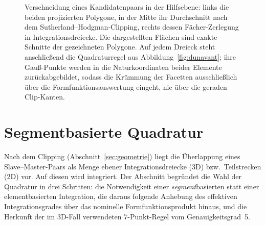 \documentclass[a4paper,11pt]{article}
\let\stdsection\section
\renewcommand{\section}{\clearpage\stdsection}
\begin{document}
\begin{figure}[htbp]
\caption[Projektion, Clipping und Triangulierung]{Verschneidung eines Kandidatenpaars in der
Hilfsebene: links die beiden projizierten Polygone, in der Mitte ihr Durchschnitt nach dem
Sutherland--Hodgman-Clipping, rechts dessen Fächer-Zerlegung in Integrationsdreiecke. Die
dargestellten Flächen sind exakte Schnitte der gezeichneten Polygone. Auf jedem Dreieck steht
anschließend die Quadraturregel aus Abbildung~\ref{fig:dunavant}; ihre Gauß-Punkte werden in die
Naturkoordinaten beider Elemente zurückabgebildet, sodass die Krümmung der Facetten ausschließlich
über die Formfunktionsauswertung eingeht, nie über die geraden Clip-Kanten.}
\label{fig:clipping}
\end{figure}

\section{Segmentbasierte Quadratur}
\label{sec:quadratur}

Nach dem Clipping (Abschnitt~\ref{sec:geometrie}) liegt die Überlappung eines Slave--Master-Paars
als Menge ebener Integrationsdreiecke (3D) bzw.\ Teilstrecken (2D) vor. Auf diesen wird integriert.
Der Abschnitt begründet die Wahl der Quadratur in drei Schritten: die Notwendigkeit einer
\emph{segment}basierten statt einer elementbasierten Integration, die daraus folgende Anhebung des
effektiven Integrationsgrades über das nominelle Formfunktionsprodukt hinaus, und die Herkunft der
im 3D-Fall verwendeten 7-Punkt-Regel vom Genauigkeitsgrad~5.
\end{document}
